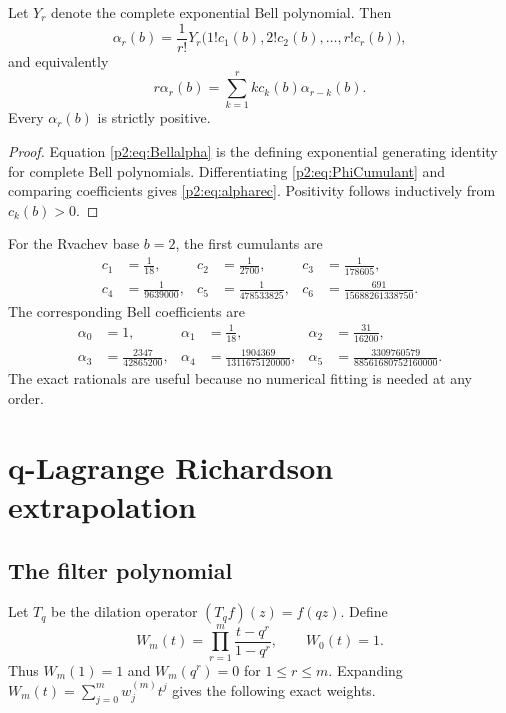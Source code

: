 \documentclass[11pt,oneside]{article}
\numberwithin{equation}{section}
\theoremstyle{definition}
\theoremstyle{remark}
\begin{document}
\begin{proposition}
\label{p2:prop:Bell}
Let \(Y_r\) denote the complete exponential Bell polynomial. Then
\begin{equation}
 \alpha_r(b)=\frac1{r!}
 Y_r\bigl(1!c_1(b),2!c_2(b),\ldots,r!c_r(b)\bigr),
 \label{p2:eq:Bellalpha}
\end{equation}
and equivalently
\begin{equation}
 r\alpha_r(b)=\sum_{k=1}^r k c_k(b)\alpha_{r-k}(b).
 \label{p2:eq:alpharec}
\end{equation}
Every \(\alpha_r(b)\) is strictly positive.
\end{proposition}

\begin{proof}
Equation \eqref{p2:eq:Bellalpha} is the defining exponential generating identity for
complete Bell polynomials. Differentiating \eqref{p2:eq:PhiCumulant} and comparing
coefficients gives \eqref{p2:eq:alpharec}. Positivity follows inductively from
\(c_k(b)>0\).
\end{proof}

For the Rvachev base \(b=2\), the first cumulants are
\begin{align*}
 c_1&=\frac1{18},&c_2&=\frac1{2700},&c_3&=\frac1{178605},\\
 c_4&=\frac1{9639000},&c_5&=\frac1{478533825},&
 c_6&=\frac{691}{15688261338750}.
\end{align*}
The corresponding Bell coefficients are
\begin{align}
 \alpha_0&=1,&
 \alpha_1&=\frac1{18},&
 \alpha_2&=\frac{31}{16200},\\
 \alpha_3&=\frac{2347}{42865200},&
 \alpha_4&=\frac{1904369}{1311675120000},&
 \alpha_5&=\frac{3309760579}{88561680752160000}.
 \label{p2:eq:alphaB2}
\end{align}
The exact rationals are useful because no numerical fitting is needed at any
order.

\section{q-Lagrange Richardson extrapolation}
\label{p2:sec:filter}

\subsection{The filter polynomial}

Let \(T_q\) be the dilation operator \((T_qf)(z)=f(qz)\). Define
\begin{equation}
 W_m(t)=\prod_{r=1}^m\frac{t-q^r}{1-q^r},
 \qquad W_0(t)=1.
 \label{p2:eq:Wm}
\end{equation}
Thus \(W_m(1)=1\) and \(W_m(q^r)=0\) for \(1\leq r\leq m\).
Expanding \(W_m(t)=\sum_{j=0}^m w_j^{(m)}t^j\) gives the following exact
weights.
\end{document}
